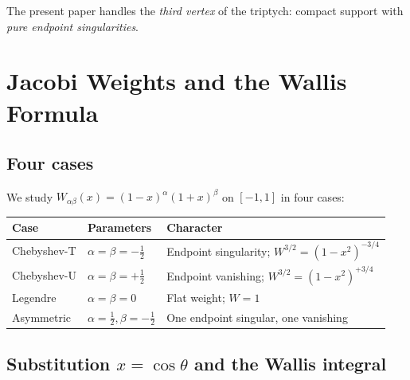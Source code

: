 \documentclass[11pt,a4paper]{article}
\begin{document}
\noindent The present paper handles the \emph{third vertex} of the triptych:
compact support with \emph{pure endpoint singularities}.

\section{Jacobi Weights and the Wallis Formula}

\subsection{Four cases}

We study $W_{\alpha\beta}(x)=(1-x)^\alpha(1+x)^\beta$ on $[-1,1]$ in four cases:

\begin{center}
\begin{tabular}{@{}lll@{}}
\toprule
Case & Parameters & Character \\
\midrule
Chebyshev-T & $\alpha=\beta=-\tfrac12$ & Endpoint singularity; $W^{3/2}=(1-x^2)^{-3/4}$ \\
Chebyshev-U & $\alpha=\beta=+\tfrac12$ & Endpoint vanishing; $W^{3/2}=(1-x^2)^{+3/4}$ \\
Legendre     & $\alpha=\beta=0$ & Flat weight; $W=1$ \\
Asymmetric   & $\alpha=\tfrac12,\beta=-\tfrac12$ & One endpoint singular, one vanishing \\
\bottomrule
\end{tabular}
\end{center}

\subsection{Substitution $x=\cos\theta$ and the Wallis integral}
\end{document}
